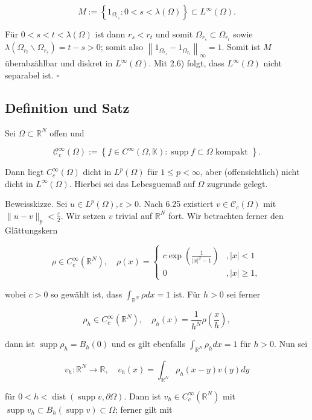 \documentclass[10pt, letterpaper]{article}
\begin{document}
$$
M:=\left\{1_{\Omega_{r_{s}}}: 0<s<\lambda(\Omega)\right\} \subset L^{\infty}(\Omega) .
$$

Für $0<s<t<\lambda(\Omega)$ ist dann $r_{s}<r_{t}$ und somit $\Omega_{r_{s}} \subset \Omega_{r_{t}}$ sowie $\lambda\left(\Omega_{r_{t}} \backslash \Omega_{r_{s}}\right)= t-s>0$; somit also $\left\|1_{\Omega_{r_{s}}}-1_{\Omega_{r_{t}}}\right\|_{\infty}=1$. Somit ist $M$ überabzählbar und diskret in $L^{\infty}(\Omega)$. Mit 2.6) folgt, dass $L^{\infty}(\Omega)$ nicht separabel ist. \(\square\)

\subsection*{Definition und Satz}
Sei $\Omega \subset \mathbb{R}^{N}$ offen und

$$
\mathcal{C}_{c}^{\infty}(\Omega):=\left\{f \in C^{\infty}(\Omega, \mathbb{K}): \operatorname{supp} f \subset \Omega \text { kompakt }\right\} .
$$

Dann liegt $C_{c}^{\infty}(\Omega)$ dicht in $L^{p}(\Omega)$ für $1 \leq p<\infty$, aber (offensichtlich) nicht dicht in $L^{\infty}(\Omega)$. Hierbei sei das Lebesguemaß auf $\Omega$ zugrunde gelegt.

Beweisskizze. Sei $u \in L^{p}(\Omega), \varepsilon>0$. Nach 6.25 existiert $v \in \mathcal{C}_{c}(\Omega)$ mit $\|u-v\|_{p}<\frac{\varepsilon}{2}$. Wir setzen $v$ trivial auf $\mathbb{R}^{N}$ fort. Wir betrachten ferner den Glättungskern

$$
\rho \in C_{c}^{\infty}\left(\mathbb{R}^{N}\right), \quad \rho(x)= \begin{cases}c \exp \left(\frac{1}{|x|^{2}-1}\right) & ,|x|<1 \\ 0 & ,|x| \geq 1,\end{cases}
$$

wobei $c>0$ so gewählt ist, dass $\int_{\mathbb{R}^{N}} \rho d x=1$ ist. Für $h>0$ sei ferner

$$
\rho_{h} \in C_{c}^{\infty}\left(\mathbb{R}^{N}\right), \quad \rho_{h}(x)=\frac{1}{h^{N}} \rho\left(\frac{x}{h}\right),
$$

dann ist $\operatorname{supp} \rho_{h}=B_{h}(0)$ und es gilt ebenfalls $\int_{\mathbb{R}^{N}} \rho_{h} d x=1$ für $h>0$. Nun sei

$$
v_{h}: \mathbb{R}^{N} \rightarrow \mathbb{R}, \quad v_{h}(x)=\int_{\mathbb{R}^{N}} \rho_{h}(x-y) v(y) d y
$$

für $0<h<\operatorname{dist}(\operatorname{supp} v, \partial \Omega)$. Dann ist $v_{h} \in C_{c}^{\infty}\left(\mathbb{R}^{N}\right)$ mit $\operatorname{supp} v_{h} \subset B_{h}(\operatorname{supp} v) \subset \Omega$; ferner gilt mit
\end{document}
